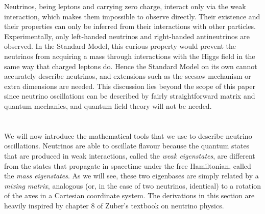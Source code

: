 \documentclass[10pt, a4paper]{article}
\begin{document}
\begin{figure}
	\label{fig:weak_vertex}
\end{figure}

Neutrinos, being leptons and carrying zero charge, interact only via the weak
interaction, which makes them impossible to observe directly. Their existence
and their properties can only be inferred from their interactions with other
particles.
Experimentally, only left-handed neutrinos and right-handed
antineutrinos are observed. In the Standard Model, this curious property would
prevent the neutrinos from acquiring a mass through interactions with the
Higgs field in the same way that charged leptons do. Hence the Standard Model
on its own cannot accurately describe neutrinos, and extensions such as the
seesaw mechanism or extra dimensions are needed. This discussion lies beyond
the scope of this paper since neutrino oscillations can be described by fairly
straightforward matrix and quantum mechanics, and quantum field theory will not
be needed. %

\section{}
We will now introduce the mathematical tools that we use to describe neutrino
oscillations. Neutrinos are able to oscillate flavour because the quantum states that
are produced in weak interactions, called the \emph{weak eigenstates}, are
different from the states that propagate in spacetime under the free
Hamiltonian, called the \emph{mass eigenstates}. As we will see, these two
eigenbases are simply related by a \emph{mixing matrix}, analogous (or, in the
case of two neutrinos, identical) to a rotation of the axes in a Cartesian
coordinate system.
The derivations in this section are heavily inspired by chapter 8 of
Zuber's textbook on neutrino physics\cite{zuber}.
\end{document}
